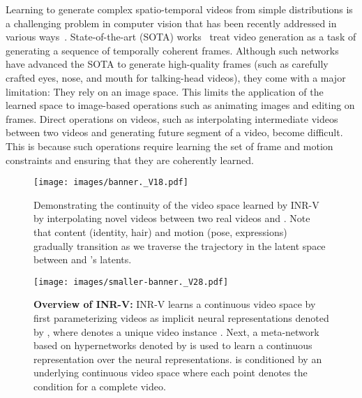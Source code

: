 \documentclass[10pt]{article} \usepackage[accepted]{tmlr}
\begin{document}
Learning to generate complex spatio-temporal videos from simple distributions is a challenging problem in computer vision that has been recently addressed in various ways~\cite{mocogan-hd, mocogan, dvd-gan, stylegan-v, tgan, digan, videogpt}. State-of-the-art (SOTA) works~\cite{stylegan-v, mocogan-hd, digan} treat video generation as a task of generating a sequence of temporally coherent frames. Although such networks have advanced the SOTA to generate high-quality frames (such as carefully crafted eyes, nose, and mouth for talking-head videos), they come with a major limitation: They rely on an image space. This limits the application of the learned space to image-based operations such as animating images and editing on frames. Direct operations on videos, such as interpolating intermediate videos between two videos and generating future segment of a video, become difficult. 
This is because such operations require learning the set of frame and motion constraints and ensuring that they are coherently learned.

\begin{figure}
  \centering
  \texttt{[image: images/banner.\_V18.pdf]}
    \caption{Demonstrating the continuity of the video space learned by INR-V by interpolating novel videos between two real videos  and . Note that content (identity, hair) and motion (pose, expressions) gradually transition as we traverse the trajectory in the latent space between  and 's latents.}
  \label{fig:banner-interpolation}
\end{figure}

\begin{wrapfigure}[23]{R}{0.4\textwidth}
\centering
\vspace{-21pt}
\texttt{[image: images/smaller-banner.\_V28.pdf]}
\caption{\textbf{Overview of INR-V:}  INR-V learns a continuous video space by first parameterizing videos as implicit neural representations denoted by , where  denotes a unique video instance . Next, a meta-network based on hypernetworks denoted by  is used to learn a continuous representation over the neural representations.  is conditioned by an underlying continuous video space where each point denotes the condition for a complete video.}
\label{fig:arch-teaser}
\end{wrapfigure}
\end{document}
